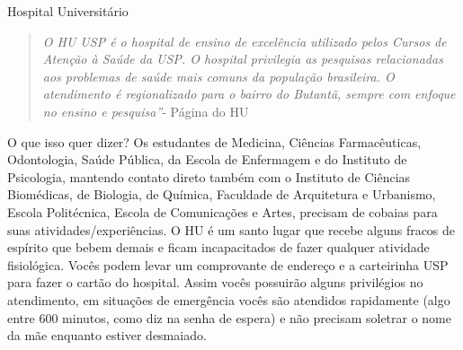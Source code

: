 \begin{secao}{Hospital Universitário}
   \begin{quote}\emph{O HU USP é o hospital de ensino de excelência utilizado
pelos Cursos de Atenção à Saúde da USP.  O hospital privilegia as pesquisas
relacionadas aos problemas de saúde  mais comuns da população brasileira. O
atendimento é regionalizado para o bairro do Butantã, sempre com enfoque no
ensino e pesquisa''}- Página do HU
   \end{quote}

O que isso quer dizer? Os estudantes de Medicina, Ciências Farmacêuticas,
Odontologia, Saúde Pública, da Escola de Enfermagem e do Instituto de
Psicologia, mantendo contato direto também com o Instituto de Ciências
Biomédicas, de Biologia, de Química, Faculdade de Arquitetura e Urbanismo,
Escola Politécnica, Escola de Comunicações e Artes, precisam de cobaias para
suas atividades/experiências. O HU é um santo lugar que recebe alguns fracos
de espírito que bebem demais e ficam incapacitados de fazer qualquer atividade
fisiológica. Vocês podem levar um comprovante de endereço e a
carteirinha USP para fazer o cartão do hospital. Assim vocês possuirão alguns
privilégios no atendimento, em situações de emergência vocês são atendidos
rapidamente (algo entre 600 minutos, como diz na senha de espera) e não
precisam soletrar o nome da mãe enquanto estiver desmaiado.

\end{secao}
